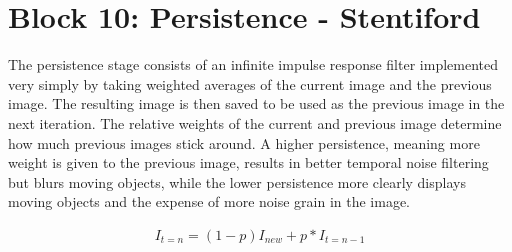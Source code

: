 
\section{Block 10: Persistence - Stentiford}

The persistence stage consists of an infinite impulse response filter 
implemented very simply by taking weighted averages of the current 
image and the previous image. The resulting image is then saved to be 
used as the previous image in the next iteration. The relative weights 
of the current and previous image determine how much previous images 
stick around. A higher persistence, meaning more weight is given to the 
previous image, results in better temporal noise filtering but blurs 
moving objects, while the lower persistence more clearly displays moving 
objects and the expense of more noise grain in the image.

\begin{align*}
    I_{t = n} = (1 - p)I_{new} + p*I_{t = n - 1}
\end{align*}